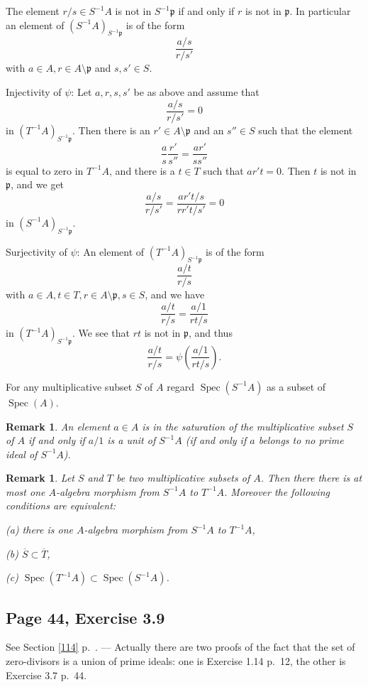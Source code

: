 \documentclass[parskip=half,fontsize=12pt]{scrartcl}%
\newcommand{\mf}{\mathfrak}
\newcommand{\ppp}{\mf p}
\newcommand{\Spec}{\operatorname{Spec}}\newcommand{\Sp}{\operatorname{Spec}}
\newtheorem{rk}[thm]{Remark}
\begin{document}
The element $r/s\in S^{-1}A$ is not in $S^{-1}\ppp$ if and only if $r$ is not in $\ppp$. In particular an element of $(S^{-1}A)_{S^{-1}\ppp}$ is of the form 
$$
\frac{a/s}{r/s'}
$$ 
with $a\in A, r\in A\setminus\ppp$ and $s,s'\in S$.

Injectivity of $\psi$: Let $a,r,s,s'$ be as above and assume that  
$$
\frac{a/s}{r/s'}=0
$$ 
in $(T^{-1}A)_{S^{-1}\ppp}$. Then there is an $r'\in A\setminus\ppp$ and an $s''\in S$ such that the element 
$$
\frac{a}{s}\frac{r'}{s''}=\frac{ar'}{ss''}
$$ 
is equal to zero in $T^{-1}A$, and there is a $t\in T$ such that $ar't=0$. Then $t$ is not in $\ppp$, and we get %
$$
\frac{a/s}{r/s'}=\frac{ar't/s}{rr't/s'}=0
$$ 
in $(S^{-1}A)_{S^{-1}\ppp}$.

Surjectivity of $\psi$: An element of $(T^{-1}A)_{S^{-1}\ppp}$ is of the form 
$$
\frac{a/t}{r/s}
$$ 
with $a\in A,t\in T,r\in A\setminus\ppp, s\in S$, and we have 
$$
\frac{a/t}{r/s}=\frac{a/1}{rt/s}
$$ 
in $(T^{-1}A)_{S^{-1}\ppp}$. We see that $rt$ is not in $\ppp$, and thus 
$$
\frac{a/t}{r/s}=\psi\left(\frac{a/1}{rt/s}\right).
$$

For any multiplicative subset $S$ of $A$ regard $\Spec(S^{-1}A)$ as a subset of $\Spec(A)$.

\begin{rk}\label{sat1}
An element $a\in A$ is in the saturation of the multiplicative subset $S$ of $A$ if and only if $a/1$ is a unit of $S^{-1}A$ (if and only if $a$ belongs to no prime ideal of $S^{-1}A$).
\end{rk}

\begin{rk}\label{sat2}
Let $S$ and $T$ be two multiplicative subsets of $A$. Then there there is at most one $A$-algebra morphism from $S^{-1}A$ to $T^{-1}A$. Moreover the following conditions are equivalent:

(a) there is one $A$-algebra morphism from $S^{-1}A$ to $T^{-1}A$, 

(b) $\overline S\subset\overline T$,

(c) $\Spec(T^{-1}A)\subset\Spec(S^{-1}A)$.
\end{rk}

\subsection{Page 44, Exercise 3.9}%

See Section \ref{114} p.~\pageref{114}. --- Actually there are two proofs of the fact that the set of zero-divisors  is a union of prime ideals: one is Exercise 1.14 p.~12, the other is Exercise 3.7 p.~44.
\end{document}
